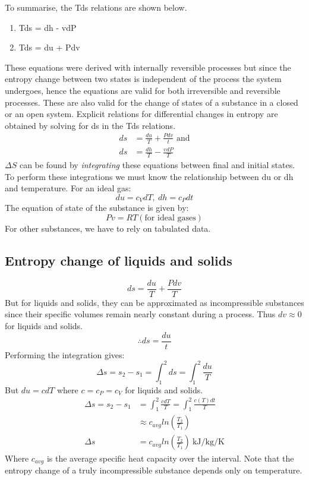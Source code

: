 \documentclass[class=report, crop=false, 12pt,a4paper]{standalone}
\numberwithin{equation}{section}
\begin{document}
To summarise, the Tds relations are shown below.
\begin{enumerate}[noitemsep]
  \item Tds = dh - vdP
  \item Tds = du + Pdv
\end{enumerate}
These equations were derived with internally reversible processes but since the entropy change between two states is independent of the process the system undergoes, hence the equations are valid for both irreversible and reversible processes. These are also valid for the change of states of a substance in a closed or an open system. Explicit relations for differential changes in entropy are obtained by solving for ds in the Tds relations.
\begin{align}
  ds &= \frac{du}{T} + \frac{Pdv}{t} \textrm{ and}\\
  ds &= \frac{dh}{T} - \frac{vdP}{T}
\end{align}
\(\Delta S\) can be found by \emph{integrating} these equations between final and initial states. To perform these integrations we must know the relationship between du or dh and temperature. For an ideal gas:
\begin{equation} 
  du = c_V dT, \ dh = c_P dt 
\end{equation}
The equation of state of the substance is given by:
\begin{equation} 
  Pv = RT (\textrm{for ideal gases}) 
\end{equation}
For other substances, we have to rely on tabulated data.
\subsection{Entropy change of liquids and solids}
\begin{equation} 
  ds = \frac{du}{T} + \frac{Pdv}{T} 
\end{equation}
But for liquids and solids, they can be approximated as incompressible substances since their specific volumes remain nearly constant during a process. Thus \(dv \approx 0 \) for liquids and solids.
\begin{equation} 
  \therefore ds = \frac{du}{t}
\end{equation}
Performing the integration gives:
\begin{equation} 
  \Delta s = s_2 - s_1 = \int_1^2 ds = \int_1^2 \frac{du}{T} 
\end{equation}
But \(du = cdT\) where \( c = c_P = c_V\) for liquids and solids.
\begin{align}
  \Delta s = s_2 - s_1 &= \int_1^2 \frac{cdT}{T} = \int_1^2 \frac{c(T)dt}{T}\\
  &\approx c_{avg} ln(\frac{T_2}{T_1})\\
  \Delta s &= c_{avg} ln(\frac{T_2}{T_1}) \ \si{\kilo\joule\per\kg\per\kelvin}
\end{align}
Where \(c_{avg}\) is the average specific heat capacity over the interval. Note that the entropy change of a truly incompressible substance depends only on temperature.
\end{document}
